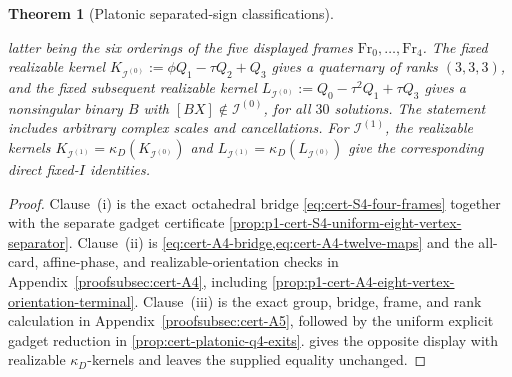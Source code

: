 \documentclass[11pt,letterpaper,onecolumn]{article}
\theoremstyle{plain}
\newtheorem{theorem}{Theorem}[section]
\theoremstyle{definition}
\theoremstyle{remark}
\newcommand{\IcoZero}{{\mathcal I^{(0)}}}
\newcommand{\IcoOne}{{\mathcal I^{(1)}}}
\begin{document}
\begin{theorem}[Platonic separated-sign classifications]
\begin{enumerate}[label=\textnormal{(\roman*)}]
      latter being the six orderings of the five displayed frames
      \(\mathrm{Fr}_0,\ldots,\mathrm{Fr}_4\).  The fixed realizable kernel
      \(K_{\IcoZero}:=\phi Q_1-\tau Q_2+Q_3\) gives a quaternary of ranks
      \((3,3,3)\), and the fixed subsequent realizable kernel
      \(L_{\IcoZero}:=Q_0-\tau^2Q_1+\tau Q_3\) gives a nonsingular binary \(B\) with \([BX]\notin\IcoZero\), for all \(30\) solutions.  The statement
      includes arbitrary complex scales and cancellations.  For
      \(\IcoOne\), the realizable kernels
      \(K_{\IcoOne}=\kappa_D(K_{\IcoZero})\) and
      \(L_{\IcoOne}=\kappa_D(L_{\IcoZero})\) give the corresponding
      direct fixed-\(I\) identities.
\end{enumerate}
\end{theorem}

\begin{proof}
Clause~\textnormal{(i)} is the exact octahedral bridge
\cref{eq:cert-S4-four-frames} together with the separate gadget certificate
\cref{prop:p1-cert-S4-uniform-eight-vertex-separator}.  Clause~\textnormal{(ii)}
is \cref{eq:cert-A4-bridge,eq:cert-A4-twelve-maps} and the all-card,
affine-phase, and realizable-orientation checks in
Appendix~\ref{proofsubsec:cert-A4}, including
\cref{prop:p1-cert-A4-eight-vertex-orientation-terminal}.  Clause~\textnormal{(iii)}
is the exact group, bridge, frame, and rank calculation in
Appendix~\ref{proofsubsec:cert-A5}, followed by the uniform explicit gadget reduction in
\cref{prop:cert-platonic-q4-exits}.
 gives the opposite display with
realizable \(\kappa_D\)-kernels and leaves the supplied equality unchanged.
\end{proof}
\end{document}
